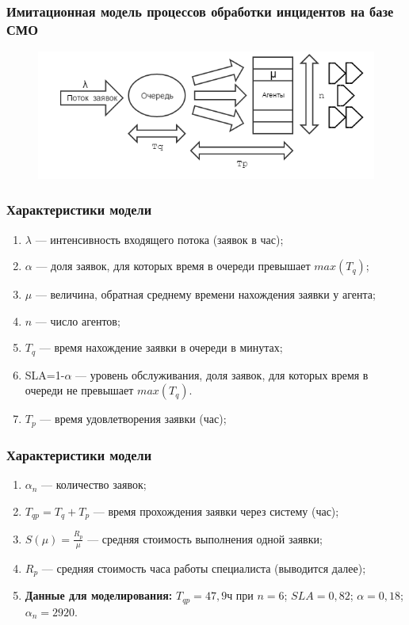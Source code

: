 \documentclass[14pt]{beamer}
\begin{document}
\begin{frame}
\frametitle{Имитационная модель процессов обработки инцидентов на базе СМО}
\begin{figure} [h] 
  \center
  \includegraphics [scale=0.5] {mass_service}
  \label{img:mass_service}  
\end{figure}

\end{frame}

\begin{frame}
\frametitle{Характеристики модели}
\begin{enumerate}
 \item $\lambda$ --- интенсивность входящего потока (заявок в час);
    \item $\alpha$ --- доля заявок, для которых время в очереди превышает $max(T_q)$;       
    \item $\mu$ --- величина, обратная среднему времени нахождения заявки у агента;
	\item  $n$ --- число агентов;
	\item $T_q$ --- время нахождение заявки в очереди в минутах;
	\item SLA=1-$\alpha$ --- уровень обслуживания, доля заявок, для которых время в очереди не превышает $max(T_q)$. 
	\item $T_p$ --- время удовлетворения заявки (час);
 	

\end{enumerate}
\end{frame}

\begin{frame}
\frametitle{Характеристики модели}
\begin{enumerate}
 \item $\alpha_n$ --- количество заявок;
 \item	$T_{qp}=T_q+T_p$ --- время прохождения заявки через систему (час);
 \item	$S(\mu)= \frac{R_p}{\mu} $ --- средняя стоимость выполнения одной заявки;
 \item $R_p$ --- средняя стоимость часа работы специалиста (выводится далее);
 \item \textbf{Данные для моделирования:} $T_{qp}=47,9ч$ при $n=6$; $SLA=0,82$; $\alpha=0,18$;  $\alpha_n=2920$. 
\end{enumerate}
\end{frame}
\end{document}
